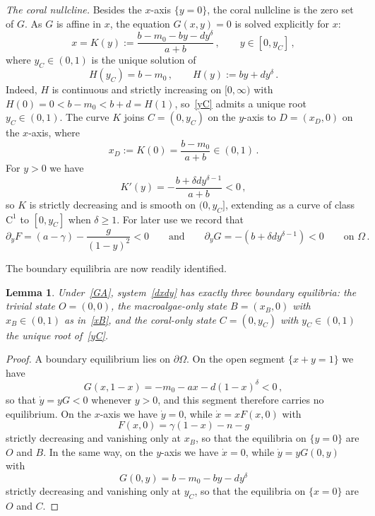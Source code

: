 \documentclass[reqno,11pt]{amsart}
\newtheorem{lem}[thm]{Lemma}
\numberwithin{equation}{section}
\begin{document}
\medskip
\noindent\textit{The coral nullcline.} Besides the $x$-axis $\{y=0\}$, the coral nullcline is the zero set of $G$. As $G$ is affine in $x$, the equation $G(x,y)=0$ is solved explicitly for $x$:
\begin{equation}\label{K}
x=K(y):=\frac{b-m_0-by-dy^{\delta}}{a+b}\,,\qquad y\in[0,y_C]\,,
\end{equation}
where $y_C\in(0,1)$ is the unique solution of
\begin{equation}\label{yC}
H(y_C)=b-m_0\,,\qquad H(y):=by+dy^{\delta}\,.
\end{equation}
Indeed, $H$ is continuous and strictly increasing on $[0,\infty)$ with $H(0)=0<b-m_0<b+d=H(1)$, so~\eqref{yC} admits a unique root $y_C\in(0,1)$. The curve $K$ joins $C=(0,y_C)$ on the $y$-axis to $D=(x_D,0)$ on the $x$-axis, where
\begin{equation}\label{xD}
x_D:=K(0)=\frac{b-m_0}{a+b}\in(0,1)\,.
\end{equation}
For $y>0$ we have
\begin{equation}\label{Kprime}
K'(y)=-\frac{b+\delta dy^{\delta-1}}{a+b}<0\,,
\end{equation}
so $K$ is strictly decreasing and is smooth on $(0,y_C]$, extending as a curve of class $\mathrm{C}^1$ to $[0,y_C]$ when $\delta\ge1$. 
For later use we record that
\begin{equation}\label{partials}
\partial_yF=(a-\gamma)-\frac{g}{(1-y)^2}<0\qquad\text{and}\qquad \partial_yG=-(b+\delta dy^{\delta-1})<0\qquad\text{on }\Omega\,.
\end{equation}

The boundary equilibria are now readily identified.

\begin{lem}\label{lem:boundary}
Under~\eqref{GA}, system~\eqref{dxdy} has exactly three boundary equilibria: the trivial state $O=(0,0)$, the macroalgae-only state $B=(x_B,0)$ with $x_B\in(0,1)$ as in~\eqref{xB}, and the coral-only state $C=(0,y_C)$ with $y_C\in(0,1)$ the unique root of~\eqref{yC}.
\end{lem}

\begin{proof}
A boundary equilibrium lies on $\partial\Omega$. On the open segment $\{x+y=1\}$ we have
\[
G(x,1-x)=-m_0-ax-d(1-x)^{\delta}<0\,,
\]
so that $\dot y=yG<0$ whenever $y>0$, and this segment therefore carries no equilibrium. On the $x$-axis we have $\dot y=0$, while $\dot x=xF(x,0)$ with
\[
F(x,0)=\gamma(1-x)-n-g
\]
strictly decreasing and vanishing only at $x_B$, so that the equilibria on $\{y=0\}$ are $O$ and $B$. In the same way, on the $y$-axis we have $\dot x=0$, while $\dot y=yG(0,y)$ with
\[
G(0,y)=b-m_0-by-dy^{\delta}
\]
strictly decreasing and vanishing only at $y_C$, so that the equilibria on $\{x=0\}$ are $O$ and $C$.
\end{proof}
\end{document}
